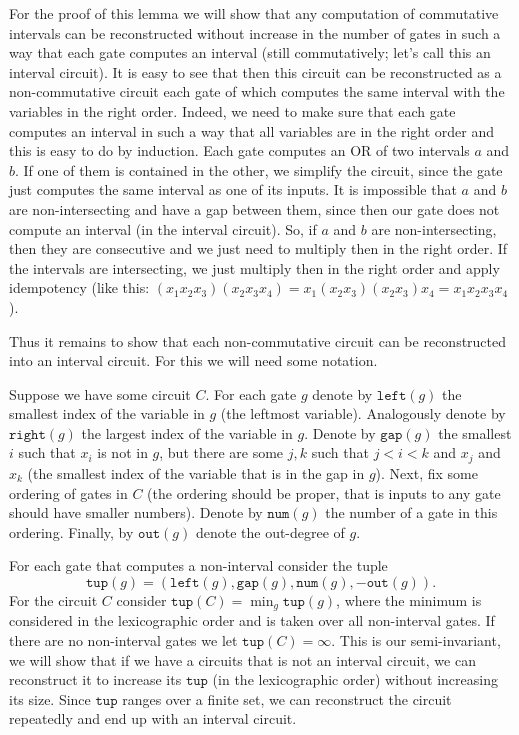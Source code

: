 \documentclass[11pt,letterpaper]{article}
\newcommand{\lef}{\texttt{left}}
\newcommand{\righ}{\texttt{right}}
\newcommand{\gap}{\texttt{gap}}
\newcommand{\num}{\texttt{num}}
\newcommand{\out}{\texttt{out}}
\newcommand{\tup}{\texttt{tup}}
\begin{document}
For the proof of this lemma we will show that any computation of commutative intervals can be reconstructed without increase in the number of gates in such a way that each gate computes an interval (still commutatively; let's call this an interval circuit). It is easy to see that then this circuit can be reconstructed as a non-commutative circuit each gate of which computes the same interval with the variables in the right order. Indeed, we need to make sure that each gate computes an interval in such a way that all variables are in the right order and this is easy to do by induction. Each gate computes an OR of two intervals $a$ and $b$. If one of them is contained in the other, we simplify the circuit, since the gate just computes the same interval as one of its inputs. It is impossible that $a$ and $b$ are non-intersecting and have a gap between them, since then our gate does not compute an interval (in the interval circuit). So, if $a$ and  $b$ are non-intersecting, then they are consecutive and we just need to multiply then in the right order. If the intervals are intersecting, we just multiply then in the right order and apply idempotency (like this: $(x_1x_2x_3)(x_2x_3x_4)=x_1(x_2x_3)(x_2x_3)x_4=x_1x_2x_3x_4$).

Thus it remains to show that each non-commutative circuit can be reconstructed into an interval circuit. For this we will need some notation.

Suppose we have some circuit $C$. For each gate $g$ denote by $\lef(g)$ the smallest index of the variable in $g$ (the leftmost variable). Analogously denote by $\righ(g)$ the largest index of the variable in $g$. Denote by $\gap(g)$ the smallest $i$ such that $x_i$ is not in $g$, but there are some $j,k$ such that $j<i<k$ and $x_j$ and $x_k$ (the smallest index of the variable that is in the gap in $g$).
Next, fix some ordering of gates in $C$ (the ordering should be proper, that is inputs to any gate should have smaller numbers). Denote by $\num(g)$ the number of a gate in this ordering. Finally, by $\out(g)$ denote the out-degree of $g$.

For each gate that computes a non-interval consider the tuple
$$
\tup(g)=(\lef(g),\gap(g),\num(g),-\out(g)).
$$ For the circuit $C$ consider $\tup(C) = \min_g \tup(g)$, where the minimum is considered in the lexicographic order and is taken over all non-interval gates. If there are no non-interval gates we let $\tup(C)=\infty$. This is our semi-invariant, we will show that if we have a circuits that is not an interval circuit, we can reconstruct it to increase  its $\tup$ (in the lexicographic order) without increasing its size. Since $\tup$ ranges over a finite set, we can reconstruct the circuit repeatedly and end up with an interval circuit.
\end{document}
